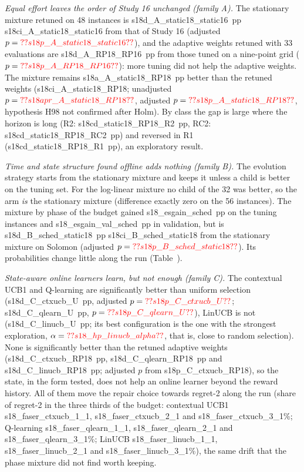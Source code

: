 \emph{Equal effort leaves the order of Study 16 unchanged (family A).} The stationary mixture retuned on 48 instances is \num{s18d_A_static18_static16}~pp \num{s18ci_A_static18_static16} from that of Study 16 (adjusted $p=\num{s18p_A_static18_static16}$), and the adaptive weights retuned with 33 evaluations are \num{s18d_A_RP18_RP16}~pp from those tuned on a nine-point grid ($p=\num{s18p_A_RP18_RP16}$): more tuning did not help the adaptive weights. The mixture remains \num{s18a_A_static18_RP18}~pp better than the retuned weights (\num{s18ci_A_static18_RP18}; unadjusted $p=\num{s18apr_A_static18_RP18}$, adjusted $p=\num{s18p_A_static18_RP18}$, hypothesis H98 not confirmed after Holm). By class the gap is large where the horizon is long (R2: \num{s18cd_static18_RP18_R2}~pp, RC2: \num{s18cd_static18_RP18_RC2}~pp) and reversed in R1 (\num{s18cd_static18_RP18_R1}~pp), an exploratory result.

\emph{Time and state structure found offline adds nothing (family B).} The evolution strategy starts from the stationary mixture and keeps it unless a child is better on the tuning set. For the log-linear mixture no child of the 32 was better, so the arm \emph{is} the stationary mixture (difference exactly zero on the 56 instances). The mixture by phase of the budget gained \num{s18_esgain_sched}~pp on the tuning instances and \num{s18_esgain_val_sched}~pp in validation, but is \num{s18d_B_sched_static18}~pp \num{s18ci_B_sched_static18} from the stationary mixture on Solomon (adjusted $p=\num{s18p_B_sched_static18}$). Its probabilities change little along the run (Table~).

\emph{State-aware online learners learn, but not enough (family C).} The contextual UCB1 and Q-learning are significantly better than uniform selection (\num{s18d_C_ctxucb_U}~pp, adjusted $p=\num{s18p_C_ctxucb_U}$; \num{s18d_C_qlearn_U}~pp, $p=\num{s18p_C_qlearn_U}$), LinUCB is not (\num{s18d_C_linucb_U}~pp; its best configuration is the one with the strongest exploration, $\alpha=\num{s18_hp_linucb_alpha}$, that is, close to random selection). None is significantly better than the retuned adaptive weights (\num{s18d_C_ctxucb_RP18}~pp, \num{s18d_C_qlearn_RP18}~pp and \num{s18d_C_linucb_RP18}~pp; adjusted $p$ from \num{s18p_C_ctxucb_RP18}), so the state, in the form tested, does not help an online learner beyond the reward history. All of them move the repair choice towards regret-2 along the run (share of regret-2 in the three thirds of the budget: contextual UCB1 \num{s18_faser_ctxucb_1_1}, \num{s18_faser_ctxucb_2_1} and \num{s18_faser_ctxucb_3_1}\%; Q-learning \num{s18_faser_qlearn_1_1}, \num{s18_faser_qlearn_2_1} and \num{s18_faser_qlearn_3_1}\%; LinUCB \num{s18_faser_linucb_1_1}, \num{s18_faser_linucb_2_1} and \num{s18_faser_linucb_3_1}\%), the same drift that the phase mixture did not find worth keeping.

